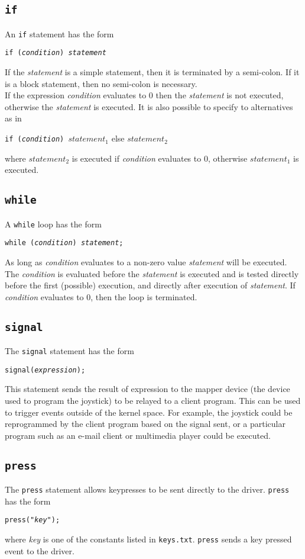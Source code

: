 \documentclass{article}
\begin{document}
\subsection{{\tt if}}
An {\tt if} statement has the form
\begin{center}
	{\tt if ({\it condition}) {\it statement}}
\end{center}
If the {\it statement} is a simple statement, then it is terminated
by a semi-colon. If it is a block statement, then no semi-colon 
is necessary.\\

If the expression {\it condition} evaluates to 0 then the
{\it statement} is not executed, otherwise the {\it statement}
is executed. It is also possible to specify to alternatives
as in
\begin{center}
	{\tt if ({\it condition}) {$statement_1$}} else $statement_2$
\end{center}
where $statement_2$ is executed if {\it condition} evaluates
to 0, otherwise $statement_1$ is executed.

\subsection{{\tt while}}
A {\tt while} loop has the form
\begin{center}
	{\tt while ({\it condition}) {\it statement};}
\end{center}
As long as {\it condition} evaluates to a non-zero value
{\it statement} will be executed. The {\it condition}
is evaluated before the {\it statement} is executed
and is tested directly before the first (possible)
execution, and directly after execution of {\it statement}.
If {\it condition} evaluates to 0, then the loop
is terminated.
\subsection{{\tt signal}}
The {\tt signal} statement has the form
\begin{center}
	{\tt signal({\it expression});}
\end{center}
This statement sends the result of expression
to the mapper device (the device used to program the joystick)
to be relayed to a client program. This can be
used to trigger events outside of the kernel
space. For example, the joystick could
be reprogrammed by the client program based
on the signal sent, or a particular program such
as an e-mail client or multimedia player could be executed.
\subsection{{\tt press}}
The {\tt press} statement allows keypresses to be sent
directly to the driver. {\tt press} has
the form
\begin{center}
	{\tt press("{\it key}");}
\end{center}
where {\it key} is one of the constants listed in {\tt keys.txt}.
{\tt press} sends a key pressed event to the driver.
\end{document}
